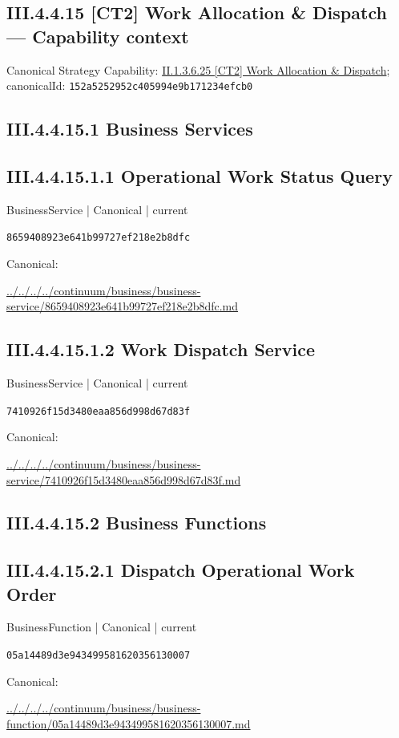 \documentclass[10pt,a4paper]{article}
\begin{document}
\subsection*{III.4.4.15 [CT2] Work Allocation \& Dispatch — Capability context}
Canonical Strategy Capability: \hyperref[element-152a5252952c405994e9b171234efcb0]{II.1.3.6.25 [CT2] Work Allocation \& Dispatch}; canonicalId: \texttt{152a5252952c405994e9b171234efcb0}\par
\subsection*{III.4.4.15.1 Business Services}
\subsection*{III.4.4.15.1.1 Operational Work Status Query}
\label{element-8659408923e641b99727ef218e2b8dfc}
{\small BusinessService | Canonical | current}\par
\texttt{8659408923e641b99727ef218e2b8dfc}\par
Canonical: \par
{\footnotesize\url{../../../../continuum/business/business-service/8659408923e641b99727ef218e2b8dfc.md}}\par
\subsection*{III.4.4.15.1.2 Work Dispatch Service}
\label{element-7410926f15d3480eaa856d998d67d83f}
{\small BusinessService | Canonical | current}\par
\texttt{7410926f15d3480eaa856d998d67d83f}\par
Canonical: \par
{\footnotesize\url{../../../../continuum/business/business-service/7410926f15d3480eaa856d998d67d83f.md}}\par
\subsection*{III.4.4.15.2 Business Functions}
\subsection*{III.4.4.15.2.1 Dispatch Operational Work Order}
\label{element-05a14489d3e943499581620356130007}
{\small BusinessFunction | Canonical | current}\par
\texttt{05a14489d3e943499581620356130007}\par
Canonical: \par
{\footnotesize\url{../../../../continuum/business/business-function/05a14489d3e943499581620356130007.md}}\par
\end{document}
